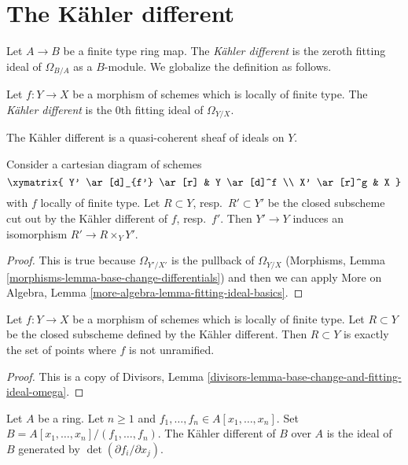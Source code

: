 \section{The K\"ahler different}
\label{section-kahler-different}

\noindent
Let $A \to B$ be a finite type ring map. The {\it K\"ahler different} is the
zeroth fitting ideal of $\Omega_{B/A}$ as a $B$-module. We globalize the
definition as follows.

\begin{definition}
\label{definition-kahler-different}
Let $f : Y \to X$ be a morphism of schemes which is locally of finite type.
The {\it K\"ahler different} is the $0$th fitting ideal of $\Omega_{Y/X}$.
\end{definition}

\noindent
The K\"ahler different is a quasi-coherent sheaf of ideals on $Y$.

\begin{lemma}
\label{lemma-base-change-kahler-different}
Consider a cartesian diagram of schemes
$$
\xymatrix{
Y' \ar[d]_{f'} \ar[r] & Y \ar[d]^f \\
X' \ar[r]^g & X
}
$$
with $f$ locally of finite type. Let $R \subset Y$, resp.\ $R' \subset Y'$
be the closed subscheme cut out by the K\"ahler different of $f$, resp.\ $f'$.
Then $Y' \to Y$ induces an isomorphism $R' \to R \times_Y Y'$.
\end{lemma}

\begin{proof}
This is true because $\Omega_{Y'/X'}$ is the pullback of $\Omega_{Y/X}$
(Morphisms, Lemma \ref{morphisms-lemma-base-change-differentials})
and then we can apply
More on Algebra, Lemma \ref{more-algebra-lemma-fitting-ideal-basics}.
\end{proof}

\begin{lemma}
\label{lemma-kahler-different}
Let $f : Y \to X$ be a morphism of schemes which is locally of finite type.
Let $R \subset Y$ be the closed subscheme defined by
the K\"ahler different. Then $R \subset Y$ is exactly
the set of points where $f$ is not unramified.
\end{lemma}

\begin{proof}
This is a copy of
Divisors, Lemma \ref{divisors-lemma-base-change-and-fitting-ideal-omega}.
\end{proof}

\begin{lemma}
\label{lemma-kahler-different-complete-intersection}
Let $A$ be a ring. Let $n \geq 1$ and
$f_1, \ldots, f_n \in A[x_1, \ldots, x_n]$.
Set $B = A[x_1, \ldots, x_n]/(f_1, \ldots, f_n)$.
The K\"ahler different of $B$ over $A$ is the ideal
of $B$ generated by $\det(\partial f_i/\partial x_j)$.
\end{lemma}

